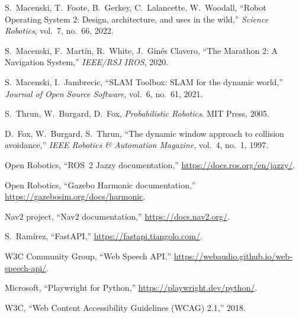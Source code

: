 \documentclass[11pt,a4paper]{article}
\begin{document}
\begin{enumerate}[label={[\arabic*]}]
  \item S.~Macenski, T.~Foote, B.~Gerkey, C.~Lalancette, W.~Woodall, ``Robot Operating System 2: Design, architecture, and uses in the wild,'' \emph{Science Robotics}, vol.~7, no.~66, 2022.
  \item S.~Macenski, F.~Martín, R.~White, J.~Ginés Clavero, ``The Marathon 2: A Navigation System,'' \emph{IEEE/RSJ IROS}, 2020.
  \item S.~Macenski, I.~Jambrecic, ``SLAM Toolbox: SLAM for the dynamic world,'' \emph{Journal of Open Source Software}, vol.~6, no.~61, 2021.
  \item S.~Thrun, W.~Burgard, D.~Fox, \emph{Probabilistic Robotics}. MIT Press, 2005.
  \item D.~Fox, W.~Burgard, S.~Thrun, ``The dynamic window approach to collision avoidance,'' \emph{IEEE Robotics \& Automation Magazine}, vol.~4, no.~1, 1997.
  \item Open Robotics, ``ROS~2 Jazzy documentation,'' \url{https://docs.ros.org/en/jazzy/}.
  \item Open Robotics, ``Gazebo Harmonic documentation,'' \url{https://gazebosim.org/docs/harmonic}.
  \item Nav2 project, ``Nav2 documentation,'' \url{https://docs.nav2.org/}.
  \item S.~Ramírez, ``FastAPI,'' \url{https://fastapi.tiangolo.com/}.
  \item W3C Community Group, ``Web Speech API,'' \url{https://webaudio.github.io/web-speech-api/}.
  \item Microsoft, ``Playwright for Python,'' \url{https://playwright.dev/python/}.
  \item W3C, ``Web Content Accessibility Guidelines (WCAG) 2.1,'' 2018.
\end{enumerate}
\end{document}
